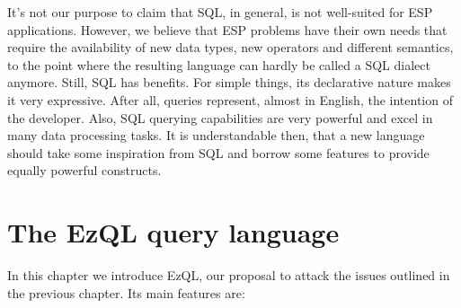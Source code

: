 \documentclass{report}
\begin{document}
It's not our purpose to claim that SQL, in general, is not well-suited
for ESP applications. However, we believe that ESP problems have their
own needs that require the availability of new data types, new
operators and different semantics, to the point where the resulting
language can hardly be called a SQL dialect anymore. Still, SQL has
benefits. For simple things, its declarative nature makes it very
expressive. After all, queries represent, almost in English, the
intention of the developer. Also, SQL querying capabilities are very
powerful and excel in many data processing tasks. It is understandable
then, that a new language should take some inspiration from SQL and
borrow some features to provide equally powerful constructs.

\chapter{The EzQL query language}
\label{chap:ezql}

In this chapter we introduce EzQL, our proposal to attack the issues
outlined in the previous chapter. Its main features are:
\end{document}
